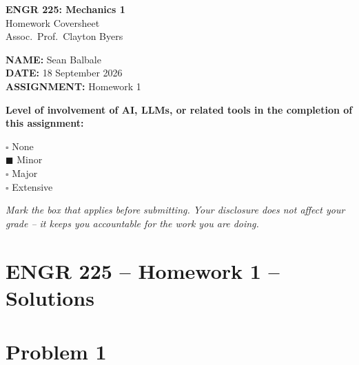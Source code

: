 \documentclass[11pt]{article}
\begin{document}
\begin{titlepage}
    \centering
    \vspace*{2cm}
    {\LARGE \bfseries ENGR 225: Mechanics 1} \\[0.3cm]
    {\Large Homework Coversheet} \\[0.3cm]
    {\large Assoc.\ Prof.\ Clayton Byers} \\[2cm]

    \begin{flushleft}
        \Large
        \textbf{NAME:} Sean Balbale \\[1cm]
        \textbf{DATE:} 18 September 2026 \\[1cm]
        \textbf{ASSIGNMENT:} Homework 1 \\[2cm]
    \end{flushleft}

    \large
    \textbf{Level of involvement of AI, LLMs, or related tools in the completion of this assignment:}

    \vspace{1cm}

    \begin{flushleft}
        \Large
        $\square$ \quad None \\[0.7cm]
        $\blacksquare$ \quad Minor \\[0.7cm]
        $\square$ \quad Major \\[0.7cm]
        $\square$ \quad Extensive \\[1.5cm]
    \end{flushleft}

    \normalsize
    \textit{Mark the box that applies before submitting. Your disclosure does not affect your grade -- it keeps you accountable for the work you are doing.}

\end{titlepage}

\section*{ENGR 225 -- Homework 1 -- Solutions}

\section*{Problem 1}
\end{document}
